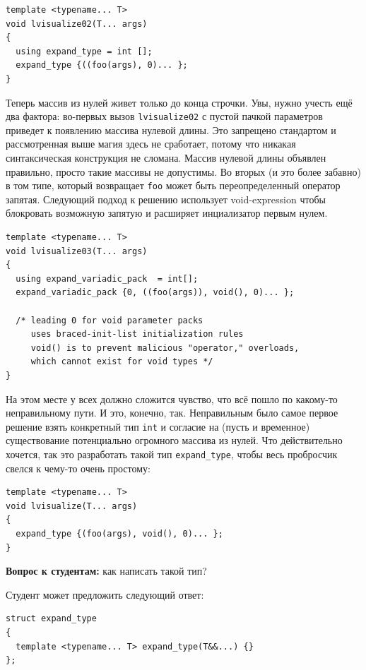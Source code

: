 \documentclass[a4paper,12pt,oneside]{article}
\newif\ifanswers
\begin{document}
\begin{lstlisting}
template <typename... T>
void lvisualize02(T... args)
{
  using expand_type = int [];
  expand_type {((foo(args), 0)... };
}
\end{lstlisting}

Теперь массив из нулей живет только до конца строчки. Увы, нужно учесть ещё два фактора: во-первых вызов \lstinline!lvisualize02! с пустой пачкой параметров приведет к появлению массива нулевой длины. Это запрещено стандартом и рассмотренная выше магия здесь не сработает, потому что никакая синтаксическая конструкция не сломана. Массив нулевой длины объявлен правильно, просто такие массивы не допустимы. Во вторых (и это более забавно) в том типе, который возвращает \lstinline!foo! может быть переопределенный оператор запятая. Следующий подход к решению использует void-expression чтобы блокровать возможную запятую и расширяет инциализатор первым нулем.

\begin{lstlisting}
template <typename... T>
void lvisualize03(T... args)
{
  using expand_variadic_pack  = int[];
  expand_variadic_pack {0, ((foo(args)), void(), 0)... };

  /* leading 0 for void parameter packs
     uses braced-init-list initialization rules
     void() is to prevent malicious "operator," overloads, 
     which cannot exist for void types */
}
\end{lstlisting}

На этом месте у всех должно сложится чувство, что всё пошло по какому-то неправильному пути. И это, конечно, так. Неправильным было самое первое решение взять конкретный тип \lstinline!int! и согласие на (пусть и временное) существование потенциально огромного массива из нулей. Что действительно хочется, так это разработать такой тип \lstinline!expand_type!, чтобы весь пробросчик свелся к чему-то очень простому:

\begin{lstlisting}
template <typename... T>
void lvisualize(T... args)
{
  expand_type {(foo(args), void(), 0)... };
}
\end{lstlisting}

\textbf{Вопрос к студентам:} как написать такой тип?

\ifanswers
Правильный ответ: см. далее
\fi

Студент может предложить следующий ответ:

\begin{lstlisting}
struct expand_type
{
  template <typename... T> expand_type(T&&...) {}
};
\end{lstlisting}
\end{document}
